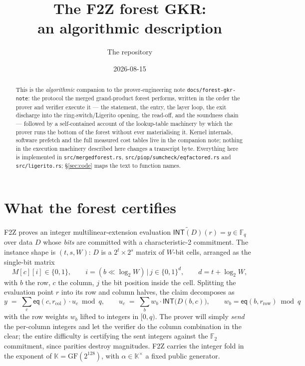 \documentclass[11pt]{article}
\title{The F2Z forest GKR:\\ an algorithmic description}
\author{The \code{f2z-pcs} repository}
\date{2026-08-15}
\newcommand{\F}{\mathbb{F}}
\newcommand{\K}{\mathbb{K}}            %
\newcommand{\Kx}{\K^{\times}}
\newcommand{\Ftwo}{\F_2}
\newcommand{\Fq}{\F_q}                 %
\newcommand{\bits}{\{0,1\}}
\newcommand{\INT}{\mathsf{INT}}
\newcommand{\mle}[1]{\widetilde{#1}}
\newcommand{\eq}{\mathsf{eq}}
\newcommand{\code}[1]{{\def\_{\textunderscore\allowbreak}\texttt{#1}}}
\theoremstyle{definition}
\begin{document}
\maketitle

\begin{abstract}
\noindent
This is the \emph{algorithmic} companion to the prover-engineering note
\code{docs/forest-gkr-note}: the protocol the merged grand-product forest
performs, written in the order the prover and verifier execute it --- the
statement, the entry, the layer loop, the exit discharge into the
ring-switch/Ligerito opening, the read-off, and the soundness chain ---
followed by a self-contained account of the lookup-table machinery by
which the prover runs the bottom of the forest without ever materialising
it.  Kernel internals, software prefetch and the full measured cost tables
live in the companion note; nothing in the execution machinery described
here changes a transcript byte.  Everything here is implemented in
\code{src/merged\_forest.rs}, \code{src/piop/sumcheck/eq\_factored.rs}
and \code{src/ligerito.rs}; \S\ref{sec:code} maps the text to function
names.
\end{abstract}

\tableofcontents

\section{What the forest certifies}
\label{sec:claim}

F2Z proves an integer multilinear-extension evaluation
$\mle{\INT(D)}(r) = y \in \Fq$ over data $D$ whose \emph{bits} are
committed with a characteristic-2 commitment.  The instance shape is
$(t, s, W)$: $D$ is a $2^t \times 2^s$ matrix of $W$-bit cells, arranged
as the single-bit matrix
\[
  M[c][i] \in \bits, \qquad
  i = (b \ll \log_2 W)\,|\,j \in \bits^{d}, \qquad
  d = t + \log_2 W,
\]
with $b$ the row, $c$ the column, $j$ the bit position inside the cell.
Splitting the evaluation point $r$ into its row and column halves, the
claim decomposes as
\[
  y \;=\; \sum_{c} \eq(c, r_{\mathrm{col}})
          \cdot u_c \bmod q,
  \qquad
  u_c \;=\; \sum_{b} w_b \cdot \INT\!\big(D(b,c)\big),
  \qquad
  w_b = \eq(b, r_{\mathrm{row}}) \bmod q
\]
with the row weights $w_b$ lifted to integers in $[0, q)$.  The prover
will simply \emph{send} the per-column integers and let the verifier do
the column combination in the clear; the entire difficulty is certifying
the sent integers against the $\Ftwo$ commitment, since parities destroy
magnitudes.  F2Z carries the integer fold in the exponent of
$\K = \mathrm{GF}(2^{128})$, with $\alpha \in \Kx$ a fixed public
generator.
\end{document}
